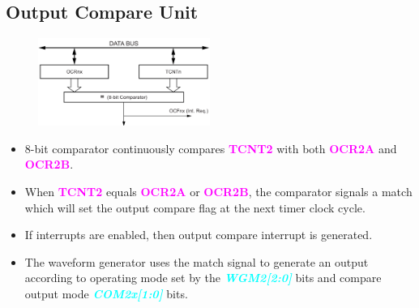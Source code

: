 \documentclass{article}
\newcommand{\bitFormat}[1]{\emph{\textbf{\textcolor{cyan}{#1}}}}
\newcommand{\regFormat}[1]{\textbf{\textcolor{magenta}{#1}}}
\begin{document}
\subsection{Output Compare Unit}
\begin{figure}[H]
    \begin{center}
        \includegraphics[width=0.5\textwidth]{Timer0CompareUnit.png}
    \end{center}
\end{figure}
\begin{itemize}
    \item 8-bit comparator continuously compares \regFormat{TCNT2} with both \regFormat{OCR2A} and \regFormat{OCR2B}.
    \item When \regFormat{TCNT2} equals \regFormat{OCR2A} or \regFormat{OCR2B}, the comparator signals a match which will set the output compare flag at the next timer clock cycle.
    \item If interrupts are enabled, then output compare interrupt is generated.
    \item The waveform generator uses the match signal to generate an output according to operating mode set by the \bitFormat{WGM2[2:0]} bits and compare output mode \bitFormat{COM2x[1:0]} bits.
\end{itemize}
\end{document}
